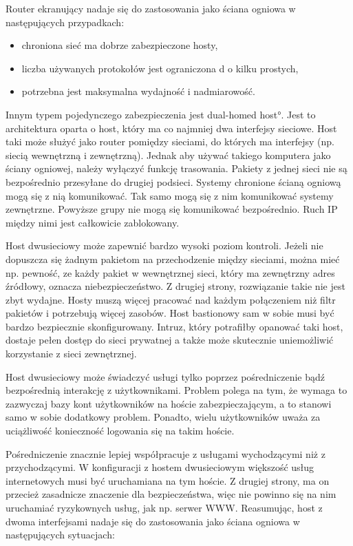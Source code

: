 Router ekranujący nadaje się do zastosowania jako ściana ogniowa w
następujących przypadkach:

\begin{itemize}

\item chroniona sieć ma dobrze zabezpieczone hosty,

\item liczba używanych protokołów jest ograniczona d o kilku prostych,

\item potrzebna jest maksymalna wydajność i nadmiarowość.

\end{itemize}

Innym typem pojedynczego zabezpieczenia jest 
\ang{dual-homed host}. Jest to architektura oparta o host, który ma co
najmniej dwa interfejsy sieciowe. Host taki może służyć jako router pomiędzy
sieciami, do których ma interfejsy (np. siecią wewnętrzną i zewnętrzną).
Jednak aby używać takiego komputera jako ściany ogniowej, należy wyłączyć
funkcję trasowania. Pakiety z jednej sieci nie są bezpośrednio przesyłane do
drugiej podsieci. Systemy chronione ścianą ogniową mogą się z nią
komunikować. Tak samo mogą się z nim komunikować systemy zewnętrzne.
Powyższe grupy nie mogą się komunikować bezpośrednio. Ruch IP między nimi
jest całkowicie zablokowany.

Host dwusieciowy może zapewnić bardzo wysoki poziom kontroli. Jeżeli nie
dopuszcza się żadnym pakietom na przechodzenie między sieciami, można mieć
np. pewność, ze każdy pakiet w wewnętrznej sieci, który ma zewnętrzny adres
źródłowy, oznacza niebezpieczeństwo. Z drugiej strony, rozwiązanie takie nie
jest zbyt wydajne. Hosty muszą więcej pracować nad każdym połączeniem niż
filtr pakietów i potrzebują więcej zasobów. Host bastionowy sam w sobie musi
być bardzo bezpiecznie skonfigurowany. Intruz, który potrafiłby opanować
taki host, dostaje pełen dostęp do sieci prywatnej a także może skutecznie
uniemożliwić korzystanie z sieci zewnętrznej.

Host dwusieciowy może świadczyć usługi tylko poprzez pośredniczenie bądź
bezpośrednią interakcję z użytkownikami. Problem polega na tym, że wymaga to
zazwyczaj bazy kont użytkowników na hoście zabezpieczającym, a to stanowi
samo w sobie dodatkowy problem. Ponadto, wielu użytkowników uważa za
uciążliwość konieczność logowania się na takim hoście.

Pośredniczenie znacznie lepiej współpracuje z usługami wychodzącymi niż z
przychodzącymi. W konfiguracji z hostem dwusieciowym większość usług
internetowych musi być uruchamiana na tym hoście. Z drugiej strony, ma on
przecież zasadnicze znaczenie dla bezpieczeństwa, więc nie powinno się na
nim uruchamiać ryzykownych usług, jak np. serwer WWW. Reasumując, host z
dwoma interfejsami nadaje się do zastosowania jako ściana ogniowa w
następujących sytuacjach:

